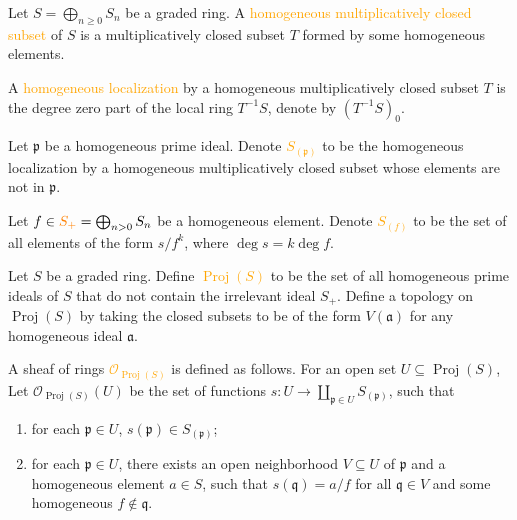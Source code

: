 \begin{definition}
	Let $S=\bigoplus_{n\geqslant0}S_n$ be a graded ring.  A \textcolor{orange}{homogeneous multiplicatively closed subset} of $S$ is a multiplicatively closed subset $T$ formed by some homogeneous elements.
	
	A \textcolor{orange}{homogeneous localization} by a homogeneous multiplicatively closed subset $T$ is the degree zero part of the local ring $T^{-1}S$, denote by $\left(T^{-1}S\right)_0$.
	
	Let $\mathfrak{p}$ be a homogeneous prime ideal. Denote \textcolor{orange}{$S_{(\mathfrak{p})}$} to be the homogeneous localization by a homogeneous multiplicatively closed subset whose elements are not in $\mathfrak{p}$.
	
	Let $f\in\mathcolor{orange}{S_+}=\bigoplus_{n>0}S_n$ be a homogeneous element.  Denote \textcolor{orange}{$S_{(f)}$} to be the set of all elements of the form $s/f^k$, where $\deg s=k\deg f$.
\end{definition}

\begin{definition}
	Let $S$ be a graded ring. Define \textcolor{orange}{$\operatorname{Proj}(S)$} to be the set of all homogeneous prime ideals of $S$ that do not contain the irrelevant ideal $S_+$. Define a topology on $\operatorname{Proj}(S)$ by taking the closed subsets to be of the form $V(\mathfrak{a})$ for any homogeneous ideal $\mathfrak{a}$.
	
	A sheaf of rings \textcolor{orange}{$\mathcal{O}_{\operatorname{Proj}(S)}$} is defined as follows. For an open set $U\subseteq\operatorname{Proj}(S)$, Let $\mathcal{O}_{\operatorname{Proj}(S)}(U)$ be the set of functions $s:U\rightarrow\coprod_{\mathfrak{p}\in U}S_{(\mathfrak{p})}$, such that
	\begin{enumerate}[label=\textup{(\arabic*)}]
		\item for each $\mathfrak{p}\in U$, $s(\mathfrak{p})\in S_{(\mathfrak{p})}$;
		\item for each $\mathfrak{p}\in U$, there exists an open neighborhood $V\subseteq U$ of $\mathfrak{p}$ and a homogeneous element $a\in S$, such that $s(\mathfrak{q})=a/f$ for all $\mathfrak{q}\in V$ and some homogeneous $f\notin\mathfrak{q}$.
	\end{enumerate}
\end{definition}

